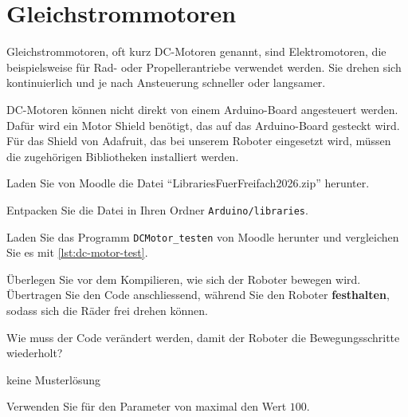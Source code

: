 \section{Gleichstrommotoren}
Gleichstrommotoren, oft kurz DC-Motoren genannt, sind Elektromotoren, die beispielsweise für Rad- oder Propellerantriebe verwendet werden. Sie drehen sich kontinuierlich und je nach Ansteuerung schneller oder langsamer.

DC-Motoren können nicht direkt von einem Arduino-Board angesteuert werden. Dafür wird ein Motor Shield benötigt, das auf das Arduino-Board gesteckt wird. Für das Shield von Adafruit, das bei unserem Roboter eingesetzt wird, müssen die zugehörigen Bibliotheken installiert werden.

\begin{myexercise}
\begin{aenum}
	\item Laden Sie von Moodle die Datei \enquote{LibrariesFuerFreifach2026.zip} herunter.
	\item Entpacken Sie die Datei in Ihren Ordner \texttt{Arduino/libraries}.
	\item Laden Sie das Programm \texttt{DCMotor\_testen} von Moodle herunter und vergleichen Sie es mit \cref{lst:dc-motor-test}.
	\item Überlegen Sie vor dem Kompilieren, wie sich der Roboter bewegen wird. Übertragen Sie den Code anschliessend, während Sie den Roboter \textbf{festhalten}, sodass sich die Räder frei drehen können.
	\item Wie muss der Code verändert werden, damit der Roboter die Bewegungsschritte wiederholt?
\end{aenum}
\begin{myanswer}
keine Musterlösung
\end{myanswer}
\end{myexercise}

\begin{myattention}
Verwenden Sie für den Parameter von  maximal den Wert $100$.
\end{myattention}



